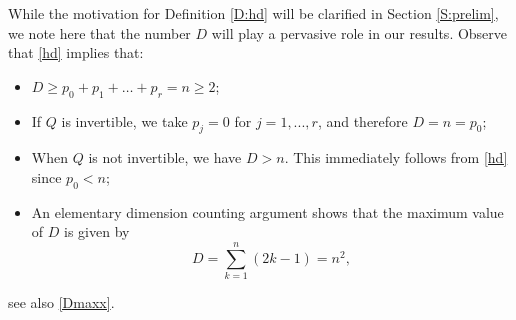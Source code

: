 \documentclass[11pt,letter]{amsart}
\numberwithin{equation}{section}
\numberwithin{equation}{section}
\begin{document}
\medskip

While the motivation for Definition \ref{D:hd} will be clarified in Section \ref{S:prelim}, we note here that the number $D$ will play a pervasive role in our results. Observe that \eqref{hd} implies that:
\begin{itemize}  
\item[(a)] $D\ge p_0+p_1+\ldots+p_r = n\ge 2$;
\item[(b)] If $Q$ is invertible, we take $p_j=0$ for $j=1,...,r$, and therefore $D =n= p_0$;
\item[(c)] When $Q$ is not invertible, we have $D>n$. This immediately follows from \eqref{hd} since $p_0<n$;
\item[(d)] An elementary dimension counting argument shows that the maximum value of $D$ is given by 
\begin{equation}\label{Dmax}
D= \sum_{k=1}^{n} (2k - 1) = n^2,
\end{equation}
\end{itemize}
see also \eqref{Dmaxx}.




\vskip 0.2in
\end{document}

